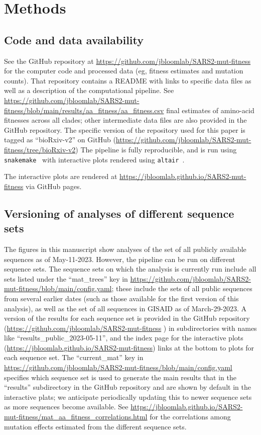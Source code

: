\documentclass[9pt,twocolumn,twoside]{gsajnl_modified}
\begin{document}
{\small

\section{Methods}
\subsection{Code and data availability}
See the GitHub repository at \url{https://github.com/jbloomlab/SARS2-mut-fitness} for the computer code and processed data (eg, fitness estimates and mutation counts).
That repository contains a README with links to specific data files as well as a description of the computational pipeline.
See \url{https://github.com/jbloomlab/SARS2-mut-fitness/blob/main/results/aa_fitness/aa_fitness.csv} final estimates of amino-acid fitnesses across all clades; other intermediate data files are also provided in the GitHub repository.
The specific version of the repository used for this paper is tagged as ``bioRxiv-v2'' on GitHub (\url{https://github.com/jbloomlab/SARS2-mut-fitness/tree/bioRxiv-v2})
The pipeline is fully reproducible, and is run using \texttt{snakemake}~\citep{molder2021sustainable} with interactive plots rendered using \texttt{altair}~\citep{vanderplas2018altair}.

The interactive plots are rendered at \url{https://jbloomlab.github.io/SARS2-mut-fitness} via GitHub pages.

\subsection{Versioning of analyses of different sequence sets}
The figures in this manuscript show analyses of the set of all publicly available sequences as of May-11-2023.
However, the pipeline can be run on different sequence sets.
The sequence sets on which the analysis is currently run include all sets listed under the ``mat\_trees'' key in \url{https://github.com/jbloomlab/SARS2-mut-fitness/blob/main/config.yaml}; these include the sets of all public sequences from several earlier dates (such as those available for the first version of this analysis), as well as the set of all sequences in GISAID as of March-29-2023.
A version of the results for each sequence set is provided in the GitHub repository (\url{https://github.com/jbloomlab/SARS2-mut-fitness} ) in subdirectories with names like ``results\_public\_2023-05-11'', and the index page for the interactive plots (\url{https://jbloomlab.github.io/SARS2-mut-fitness}) links at the bottom to plots for each sequence set.
The ``current\_mat'' key in \url{https://github.com/jbloomlab/SARS2-mut-fitness/blob/main/config.yaml} specifies which sequence set is used to generate the main results that in the ``results'' subdirectory in the GitHub repository and are shown by default in the interactive plats; we anticipate periodically updating this to newer sequence sets as more sequences become available.
See \url{https://jbloomlab.github.io/SARS2-mut-fitness/mat_aa_fitness_correlations.html} for the correlations among mutation effects estimated from the different sequence sets.

}
\end{document}
